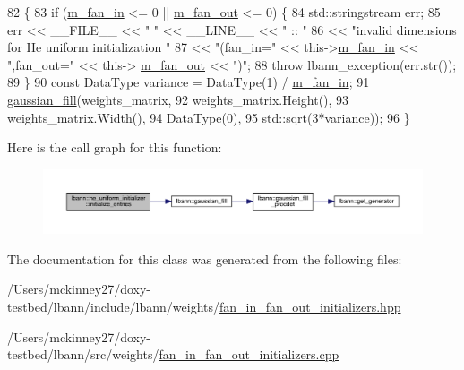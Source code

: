 \begin{DoxyCode}
82                                                                                 \{
83   \textcolor{keywordflow}{if} (\hyperlink{classlbann_1_1fan__in__fan__out__initializer_aea6639db271d9050f0a2e4f8c8dfa6cd}{m\_fan\_in} <= 0 || \hyperlink{classlbann_1_1fan__in__fan__out__initializer_ac67d275ab8574780525d2af59b738338}{m\_fan\_out} <= 0) \{
84     std::stringstream err;
85     err << \_\_FILE\_\_ << \textcolor{stringliteral}{" "} << \_\_LINE\_\_ << \textcolor{stringliteral}{" :: "}
86         << \textcolor{stringliteral}{"invalid dimensions for He uniform initialization "}
87         << \textcolor{stringliteral}{"(fan\_in="} << this->\hyperlink{classlbann_1_1fan__in__fan__out__initializer_aea6639db271d9050f0a2e4f8c8dfa6cd}{m\_fan\_in} << \textcolor{stringliteral}{",fan\_out="} << this->
      \hyperlink{classlbann_1_1fan__in__fan__out__initializer_ac67d275ab8574780525d2af59b738338}{m\_fan\_out} << \textcolor{stringliteral}{")"};
88     \textcolor{keywordflow}{throw} lbann\_exception(err.str());
89   \}
90   \textcolor{keyword}{const} DataType variance = DataType(1) / \hyperlink{classlbann_1_1fan__in__fan__out__initializer_aea6639db271d9050f0a2e4f8c8dfa6cd}{m\_fan\_in};
91   \hyperlink{namespacelbann_abd116f95f55d0e29d9a0cc386139c4b4}{gaussian\_fill}(weights\_matrix,
92                 weights\_matrix.Height(),
93                 weights\_matrix.Width(),
94                 DataType(0),
95                 std::sqrt(3*variance));
96 \}
\end{DoxyCode}
Here is the call graph for this function\+:\nopagebreak
\begin{figure}[H]
\begin{center}
\leavevmode
\includegraphics[width=350pt]{classlbann_1_1he__uniform__initializer_a8f86401b0b216ba159f57d3475769a24_cgraph}
\end{center}
\end{figure}


The documentation for this class was generated from the following files\+:\begin{DoxyCompactItemize}
\item 
/\+Users/mckinney27/doxy-\/testbed/lbann/include/lbann/weights/\hyperlink{fan__in__fan__out__initializers_8hpp}{fan\+\_\+in\+\_\+fan\+\_\+out\+\_\+initializers.\+hpp}\item 
/\+Users/mckinney27/doxy-\/testbed/lbann/src/weights/\hyperlink{fan__in__fan__out__initializers_8cpp}{fan\+\_\+in\+\_\+fan\+\_\+out\+\_\+initializers.\+cpp}\end{DoxyCompactItemize}
